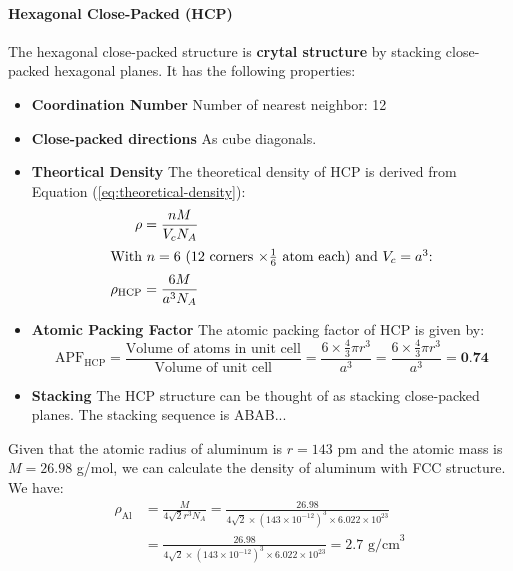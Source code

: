 \documentclass[11pt]{article}
\begin{document}
\paragraph{Hexagonal Close-Packed (HCP)} The hexagonal close-packed structure is \textbf{crytal structure} by stacking close-packed hexagonal planes. It has the following properties:
\begin{itemize}
    \item \textbf{Coordination Number} Number of nearest neighbor: 12
    \item \textbf{Close-packed directions} As cube diagonals.
    \item \textbf{Theortical Density} The theoretical density of HCP is derived from Equation (\ref{eq:theoretical-density}):
    \begin{align}
        \rho &= \frac{nM}{V_c N_A} \nonumber \\
        \intertext{With $n = 6$ (12 corners $\times \frac{1}{6}$ atom each) and $V_c = a^3$:}
        \rho_\text{HCP} &= \frac{6M}{a^3 N_A} 
    \end{align}
    \item \textbf{Atomic Packing Factor} The atomic packing factor of HCP is given by:
    \begin{equation}
        \text{APF}_\text{HCP} = \frac{\text{Volume of atoms in unit cell}}{\text{Volume of unit cell} } = \frac{6 \times \frac{4}{3}\pi r^3}{a^3} = \frac{6 \times \frac{4}{3}\pi r^3}{a^3} = \textbf{0.74}
    \end{equation}
    \item \textbf{Stacking} The HCP structure can be thought of as stacking close-packed planes. The stacking sequence is ABAB...
\end{itemize}
\begin{example}
    Given that the atomic radius of aluminum is $r = 143$ pm and the atomic mass is $M = 26.98$ g/mol, we can calculate the density of aluminum with FCC structure. We have:
    \begin{align*}
        \rho_\text{Al} &= \frac{M}{4\sqrt{2}r^3 N_A} = \frac{26.98}{4\sqrt{2} \times (143 \times 10^{-12})^3 \times 6.022 \times 10^{23}} \\
        &= \frac{26.98}{4\sqrt{2} \times (143 \times 10^{-12})^3 \times 6.022 \times 10^{23}} = 2.7 \text{ g/cm}^3
    \end{align*}
\end{example}
\end{document}
